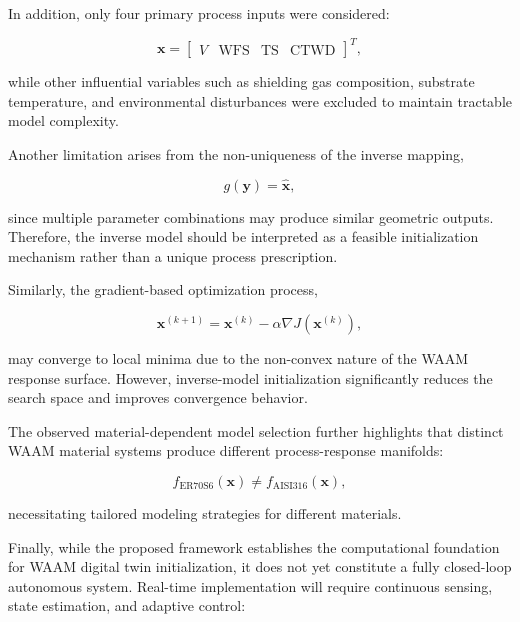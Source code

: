\documentclass[11pt]{article}
\begin{document}
In addition, only four primary process inputs were considered:

\begin{equation}
\mathbf{x} =
\begin{bmatrix}
V & \mathrm{WFS} & \mathrm{TS} & \mathrm{CTWD}
\end{bmatrix}^{T},
\end{equation}

while other influential variables such as shielding gas composition, substrate temperature, and environmental disturbances were excluded to maintain tractable model complexity.

Another limitation arises from the non-uniqueness of the inverse mapping,

\begin{equation}
g(\mathbf{y}) = \hat{\mathbf{x}},
\end{equation}

since multiple parameter combinations may produce similar geometric outputs. Therefore, the inverse model should be interpreted as a feasible initialization mechanism rather than a unique process prescription.

Similarly, the gradient-based optimization process,

\begin{equation}
\mathbf{x}^{(k+1)} =
\mathbf{x}^{(k)} - \alpha \nabla J(\mathbf{x}^{(k)}),
\end{equation}

may converge to local minima due to the non-convex nature of the WAAM response surface. However, inverse-model initialization significantly reduces the search space and improves convergence behavior.

The observed material-dependent model selection further highlights that distinct WAAM material systems produce different process-response manifolds:

\begin{equation}
f_{\mathrm{ER70S6}}(\mathbf{x}) \neq f_{\mathrm{AISI316}}(\mathbf{x}),
\end{equation}

necessitating tailored modeling strategies for different materials.

Finally, while the proposed framework establishes the computational foundation for WAAM digital twin initialization, it does not yet constitute a fully closed-loop autonomous system. Real-time implementation will require continuous sensing, state estimation, and adaptive control:
\end{document}
